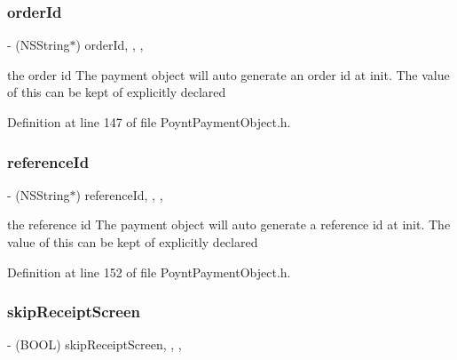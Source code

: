 \subsubsection{\texorpdfstring{order\+Id}{orderId}}
{\footnotesize\ttfamily -\/ (N\+S\+String$\ast$) order\+Id\hspace{0.3cm}{\ttfamily [read]}, {\ttfamily [write]}, {\ttfamily [nonatomic]}, {\ttfamily [copy]}}



the order id  The payment object will auto generate an order id at init. The value of this can be kept of explicitly declared 



Definition at line 147 of file Poynt\+Payment\+Object.\+h.

\hypertarget{interface_poynt_payment_object_ab9a55f2b8aef17222c41f356957e2513}{}\label{interface_poynt_payment_object_ab9a55f2b8aef17222c41f356957e2513} 
\subsubsection{\texorpdfstring{reference\+Id}{referenceId}}
{\footnotesize\ttfamily -\/ (N\+S\+String$\ast$) reference\+Id\hspace{0.3cm}{\ttfamily [read]}, {\ttfamily [write]}, {\ttfamily [nonatomic]}, {\ttfamily [copy]}}



the reference id  The payment object will auto generate a reference id at init. The value of this can be kept of explicitly declared 



Definition at line 152 of file Poynt\+Payment\+Object.\+h.

\hypertarget{interface_poynt_payment_object_a065f8677ebd1da13c2f57bd6cbbf3d7c}{}\label{interface_poynt_payment_object_a065f8677ebd1da13c2f57bd6cbbf3d7c} 
\subsubsection{\texorpdfstring{skip\+Receipt\+Screen}{skipReceiptScreen}}
{\footnotesize\ttfamily -\/ (B\+O\+OL) skip\+Receipt\+Screen\hspace{0.3cm}{\ttfamily [read]}, {\ttfamily [write]}, {\ttfamily [nonatomic]}, {\ttfamily [assign]}}



